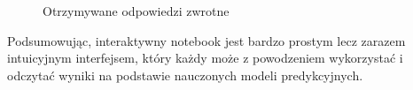 \begin{figure}[H]%
    \centering
    \qquad
    \caption{Otrzymywane odpowiedzi zwrotne}%
    \label{fig:Results}%
\end{figure}
Podsumowując, interaktywny notebook jest bardzo prostym lecz zarazem intuicyjnym interfejsem, który każdy może z powodzeniem wykorzystać i odczytać wyniki na podstawie nauczonych modeli predykcyjnych.
